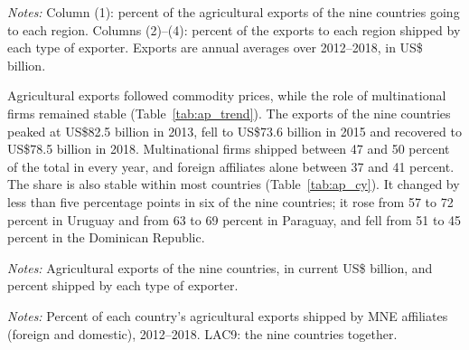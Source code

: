\begin{table}[htbp]
\centering
\caption{Agricultural exports and ownership, by destination region, annual averages 2012--2018}
\label{tab:ap_desttab}
{\small\setlength{\tabcolsep}{4pt}\setlength{\extrarowheight}{1pt}
}

\begin{minipage}{0.95\linewidth}
\notesize
\vspace{0.6em}
\textit{Notes:} Column (1): percent of the agricultural exports of the nine countries going to each region. Columns (2)--(4): percent of the exports to each region shipped by each type of exporter. Exports are annual averages over 2012--2018, in US\$ billion.\\
\srcnote
\end{minipage}
\end{table}

Agricultural exports followed commodity prices, while the role of multinational firms remained stable
(Table~\ref{tab:ap_trend}). The exports of the nine countries peaked at US\$82.5 billion in 2013, fell to US\$73.6
billion in 2015 and recovered to US\$78.5 billion in 2018. Multinational firms shipped between 47 and 50 percent of
the total in every year, and foreign affiliates alone between 37 and 41 percent. The share is also stable within most
countries (Table~\ref{tab:ap_cy}). It changed by less than five percentage points in six of the nine countries; it
rose from 57 to 72 percent in Uruguay and from 63 to 69 percent in Paraguay, and fell from 51 to 45 percent in the
Dominican Republic.
\begin{table}[htbp]
\centering
\caption{Agricultural exports by type of exporter, 2012--2018}
\label{tab:ap_trend}
{\small\setlength{\tabcolsep}{4pt}\setlength{\extrarowheight}{1pt}
}

\begin{minipage}{0.95\linewidth}
\notesize
\vspace{0.6em}
\textit{Notes:} Agricultural exports of the nine countries, in current US\$ billion, and percent shipped by each type of exporter.\\
\srcnote
\end{minipage}
\end{table}
\begin{table}[htbp]
\centering
\caption{Multinational share of agricultural exports, by exporting country and year}
\label{tab:ap_cy}
{\footnotesize\setlength{\tabcolsep}{4pt}\setlength{\extrarowheight}{1pt}
}

\begin{minipage}{0.95\linewidth}
\notesize
\vspace{0.6em}
\textit{Notes:} Percent of each country's agricultural exports shipped by MNE affiliates (foreign and domestic), 2012--2018. LAC9: the nine countries together.\\
\srcnote
\end{minipage}
\end{table}


